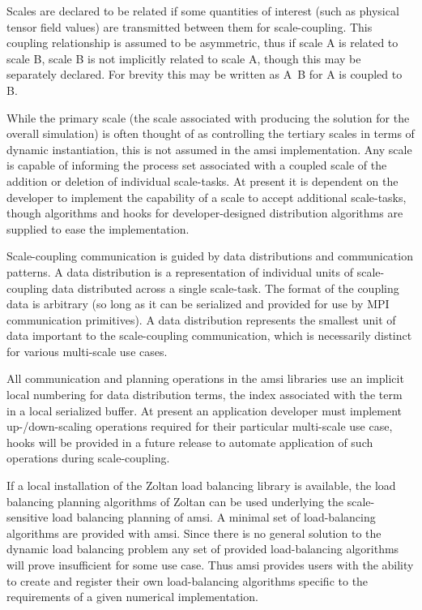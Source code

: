 \documentclass[11pt]{siamltex1213}
\begin{document}
Scales are declared to be related if some quantities of interest (such as physical tensor field values) are transmitted between them for scale-coupling. This coupling relationship is assumed to be asymmetric, thus if scale A is related to scale B, scale B is not implicitly related to scale A, though this may be separately declared. For brevity this may be written as A~B for A is coupled to B.

While the primary scale (the scale associated with producing the solution for the overall simulation) is often thought of as controlling the tertiary scales in terms of dynamic instantiation, this is not assumed in the amsi implementation. Any scale is capable of informing the process set associated with a coupled scale of the addition or deletion of individual scale-tasks. At present it is dependent on the developer to implement the capability of a scale to accept additional scale-tasks, though algorithms and hooks for developer-designed distribution algorithms are supplied to ease the implementation.

\label{amsi_communication}
Scale-coupling communication is guided by data distributions and communication patterns. A data distribution is a representation of individual units of scale-coupling data distributed across a single scale-task. The format of the coupling data is arbitrary (so long as it can be serialized and provided for use by MPI communication primitives). A data distribution represents the smallest unit of data important to the scale-coupling communication, which is necessarily distinct for various multi-scale use cases. 

All communication and planning operations in the amsi libraries use an implicit local numbering for data distribution terms, the index associated with the term in a local serialized buffer. At present an application developer must implement up-/down-scaling operations required for their particular multi-scale use case, hooks will be provided in a future release to automate application of such operations during scale-coupling.

\label{amsi_load_balancing}
If a local installation of the Zoltan \cite{ZoltanOverviewArticle2002} \cite{ZoltanIsorropiaOverview2012} load balancing library is available, the load balancing planning algorithms of Zoltan can be used underlying the scale-sensitive load balancing planning of amsi. A minimal set of load-balancing algorithms are provided with amsi. Since there is no general solution to the dynamic load balancing problem any set of provided load-balancing algorithms will prove insufficient for some use case. Thus amsi provides users with the ability to create and register their own load-balancing algorithms specific to the requirements of a given numerical implementation.
\end{document}
